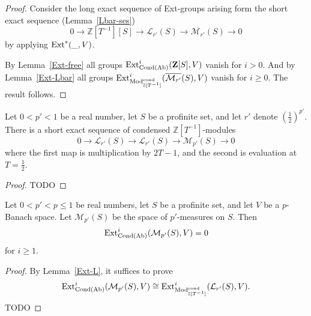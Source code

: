 \begin{proof}
  Consider the long exact sequence of Ext-groups
  arising form the short exact sequence (Lemma~\ref{Lbar-ses})
  \[
    0 \to \mathbb Z[T^{-1}][S] \to \mathcal L_{r'}(S) \to \overline{\mathcal{M}_{r'}}(S) \to 0
  \]
  by applying $\operatorname{Ext}^*(\_, V)$.

  By Lemma~\ref{Ext-free} all groups $\operatorname{Ext}_{\operatorname{Cond}(\operatorname{Ab})}^i(\mathbf{Z}[S], V)$ vanish for $i > 0$.
  And by Lemma~\ref{Ext-Lbar} all groups $\operatorname{Ext}_{\mathrm{Mod}^{\mathrm{cond}}_{\mathbb Z[T^{-1}]}}^i(\overline{\mathcal M_{r'}}(S), V)$ vanish for $i \ge 0$.
  The result follows.
\end{proof}

\begin{lemma}
  \label{M-ses}
  Let $0 < p' < 1$ be a real number,
  let $S$ be a profinite set,
  and let $r'$ denote $(\tfrac12)^{p'}$.
  There is a short exact sequence of condensed $\mathbb Z[T^{-1}]$-modules
  \[
    0 \to \mathcal L_{r'}(S) \to \mathcal L_{r'}(S) \to \mathcal M_{p'}(S) \to 0
  \]
  where the first map is multiplication by $2T - 1$, and the second is evaluation at $T = \tfrac12$.
\end{lemma}

\begin{proof}
  TODO
\end{proof}

\begin{theorem}
  \label{main-thm}
  Let $0 < p' < p \le 1$ be real numbers,
  let $S$ be a profinite set,
  and let $V$ be a $p$-Banach space.
  Let $\mathcal M_{p'}(S)$ be the space of $p'$-measures on $S$. Then
  \[ \operatorname{Ext}^i_{\operatorname{Cond}(\operatorname{Ab})}(\mathcal M_{p'}(S),V) = 0 \]
  for $i \ge 1$.
\end{theorem}

\begin{proof}
  By Lemma~\ref{Ext-L}, it suffices to prove
  \[ \operatorname{Ext}^i_{\operatorname{Cond}(\operatorname{Ab})}(\mathcal M_{p'}(S),V) \cong \operatorname{Ext}_{\mathrm{Mod}^{\mathrm{cond}}_{\mathbb Z[T^{-1}]}}^i(\mathcal L_{r'}(S), V). \]
  TODO
\end{proof}

